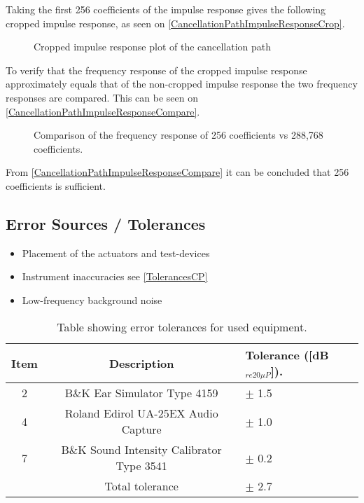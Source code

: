 Taking the first 256 coefficients of the impulse response gives the following cropped impulse response, as seen on \autoref{CancellationPathImpulseResponseCrop}.

\begin{figure}[H]
	\centering
	
	\caption{Cropped impulse response plot of the cancellation path}
	\label{CancellationPathImpulseResponseCrop}
\end{figure}
To verify that the frequency response of the cropped impulse response approximately equals that of the non-cropped impulse response the two frequency responses are compared. This can be seen on \autoref{CancellationPathImpulseResponseCompare}.

\begin{figure}[H]
	\centering
	
	\caption{Comparison of the frequency response of 256 coefficients vs 288,768 coefficients.}
	\label{CancellationPathImpulseResponseCompare}
\end{figure}

From \autoref{CancellationPathImpulseResponseCompare} it can be concluded that 256 coefficients is sufficient. 

\subsection{Error Sources / Tolerances}
\begin{itemize}
	\item Placement of the actuators and test-devices
	\item Instrument inaccuracies see \autoref{TolerancesCP}
	\item Low-frequency background noise
\end{itemize}

\begin{table}[h]
	\centering
	\begin{tabular}{ c c l } \toprule
		{Item}	& 		{Description} 	& {Tolerance ([dB$_{re20\mu P}$])}.	 \\ \bottomrule 
		2	&	B\&K Ear Simulator Type 4159				& $\pm$ 1.5 	\\
		4	&	Roland Edirol UA-25EX Audio Capture			& $\pm$ 1.0	\\
		7	&	B\&K Sound Intensity Calibrator Type 3541	& $\pm$ 0.2	\\ \bottomrule
			&	Total tolerance								& $\pm$ 2.7	\\ \bottomrule	
	\end{tabular}
	\caption{Table showing error tolerances for used equipment.}
	\label{TolerancesCP}
\end{table}

